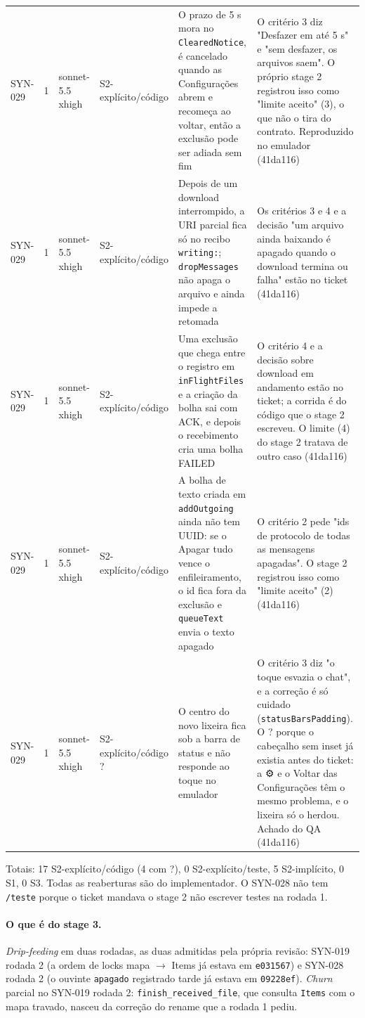 \documentclass[11pt,a4paper]{article}
\begin{document}
{\begin{longtable}{@{}l c >{\raggedright\arraybackslash}p{1.7cm} >{\raggedright\arraybackslash}p{2.4cm} >{\raggedright\arraybackslash}p{4.0cm} >{\raggedright\arraybackslash}p{4.2cm}@{}}
SYN-029 & 1 & sonnet-5.5 xhigh & S2-explícito/código & O prazo de 5 s mora no \texttt{ClearedNotice}, é cancelado quando as Configurações abrem e recomeça ao voltar, então a exclusão pode ser adiada sem fim & O critério 3 diz "Desfazer em até 5 s" e "sem desfazer, os arquivos saem". O próprio stage 2 registrou isso como "limite aceito" (3), o que não o tira do contrato. Reproduzido no emulador (41da116)\\
SYN-029 & 1 & sonnet-5.5 xhigh & S2-explícito/código & Depois de um download interrompido, a URI parcial fica só no recibo \texttt{writing:}; \texttt{dropMessages} não apaga o arquivo e ainda impede a retomada & Os critérios 3 e 4 e a decisão "um arquivo ainda baixando é apagado quando o download termina ou falha" estão no ticket (41da116)\\
SYN-029 & 1 & sonnet-5.5 xhigh & S2-explícito/código & Uma exclusão que chega entre o registro em \texttt{inFlightFiles} e a criação da bolha sai com ACK, e depois o recebimento cria uma bolha FAILED & O critério 4 e a decisão sobre download em andamento estão no ticket; a corrida é do código que o stage 2 escreveu. O limite (4) do stage 2 tratava de outro caso (41da116)\\
SYN-029 & 1 & sonnet-5.5 xhigh & S2-explícito/código & A bolha de texto criada em \texttt{addOutgoing} ainda não tem UUID: se o Apagar tudo vence o enfileiramento, o id fica fora da exclusão e \texttt{queueText} envia o texto apagado & O critério 2 pede "ids de protocolo de todas as mensagens apagadas". O stage 2 registrou isso como "limite aceito" (2) (41da116)\\
SYN-029 & 1 & sonnet-5.5 xhigh & S2-explícito/código ? & O centro do novo lixeira fica sob a barra de status e não responde ao toque no emulador & O critério 3 diz "o toque esvazia o chat", e a correção é só cuidado (\texttt{statusBarsPadding}). O ? porque o cabeçalho sem inset já existia antes do ticket: a ⚙ e o Voltar das Configurações têm o mesmo problema, e o lixeira só o herdou. Achado do QA (41da116)\\
\bottomrule
\end{longtable}}

Totais: 17 S2-explícito/código (4 com ?), 0 S2-explícito/teste, 5
S2-implícito, 0 S1, 0 S3. Todas as reaberturas são do implementador. O
SYN-028 não tem \texttt{/teste} porque o ticket mandava o stage 2 não escrever
testes na rodada 1.

\paragraph{O que é do stage 3.} \emph{Drip-feeding} em duas rodadas, as duas
admitidas pela própria revisão: SYN-019 rodada 2 (a ordem de locks mapa $\to$
Items já estava em \texttt{e031567}) e SYN-028 rodada 2 (o ouvinte
\texttt{apagado} registrado tarde já estava em \texttt{09228ef}). \emph{Churn}
parcial no SYN-019 rodada 2: \texttt{finish\_received\_file}, que consulta
\texttt{Items} com o mapa travado, nasceu da correção do rename que a rodada 1
pediu.
\end{document}
